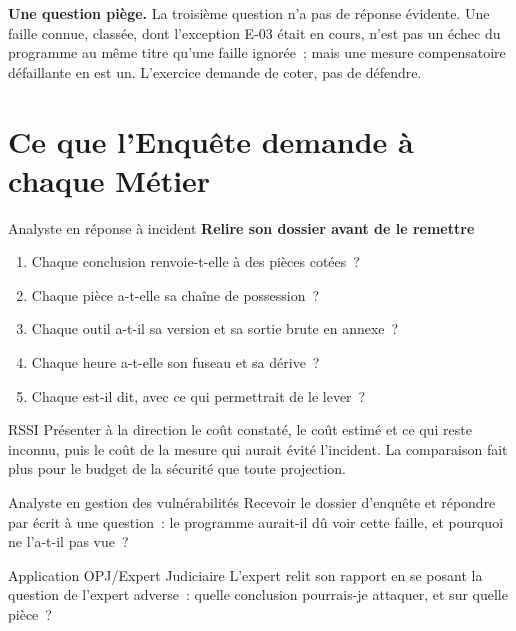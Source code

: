\begin{boxinfo}
\textbf{Une question piège.} La troisième question n'a pas de réponse
évidente. Une faille connue, classée, dont l'exception E-03 était en cours,
n'est pas un échec du programme au même titre qu'une faille ignorée~; mais
une mesure compensatoire défaillante en est un. L'exercice demande de
coter, pas de défendre.
\end{boxinfo}

\section{Ce que l'Enquête demande à chaque Métier}
\label{sec:c14-metiers}

\begin{boxmetier}{Analyste en réponse à incident}
\textbf{Relire son dossier avant de le remettre}
\begin{enumerate}
    \item Chaque conclusion renvoie-t-elle à des pièces cotées~?
    \item Chaque pièce a-t-elle sa chaîne de possession~?
    \item Chaque outil a-t-il sa version et sa sortie brute en annexe~?
    \item Chaque heure a-t-elle son fuseau et sa dérive~?
    \item Chaque \NEK{} est-il dit, avec ce qui permettrait de le lever~?
\end{enumerate}
\end{boxmetier}

\begin{boxmetier}{RSSI}
Présenter à la direction le coût constaté, le coût estimé et ce qui reste
inconnu, puis le coût de la mesure qui aurait évité l'incident. La
comparaison fait plus pour le budget de la sécurité que toute projection.
\end{boxmetier}

\begin{boxmetier}{Analyste en gestion des vulnérabilités}
Recevoir le dossier d'enquête et répondre par écrit à une question~: le
programme aurait-il dû voir cette faille, et pourquoi ne l'a-t-il pas vue~?
\end{boxmetier}

\begin{boxmetier}{Application OPJ/Expert Judiciaire}
L'expert relit son rapport en se posant la question de l'expert adverse~:
quelle conclusion pourrais-je attaquer, et sur quelle pièce~?
\end{boxmetier}

